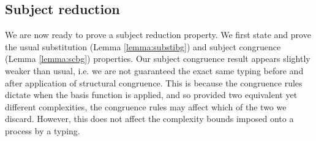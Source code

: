 \subsection{Subject reduction}
We are now ready to prove a subject reduction property. We first state and prove the usual substitution (Lemma \ref{lemma:substibg}) and subject congruence (Lemma \ref{lemma:scbg}) properties. Our subject congruence result appears slightly weaker than usual, i.e. we are not guaranteed the exact same typing before and after application of structural congruence. This is because the congruence rules dictate when the basis function is applied, and so provided two equivalent yet different complexities, the congruence rules may affect which of the two we discard. However, this does not affect the complexity bounds imposed onto a process by a typing. \\[1em]

